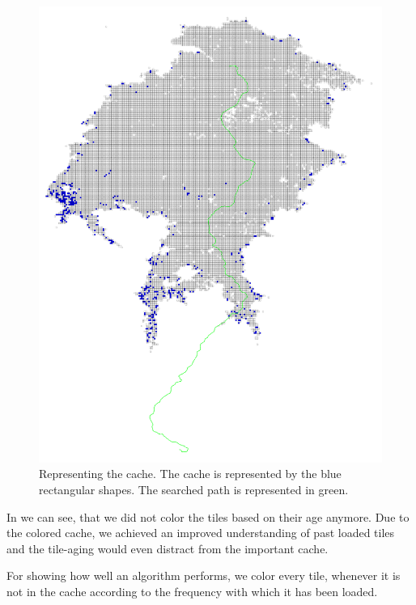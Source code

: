 \documentclass
[
    paper = a4,
    pagesize,
    12 pt,
    twoside,                       %
    open = right,
    DIV = calc,
    BCOR = 0 mm,                   %
    bibtotoc
]
{scrbook}
\begin{document}
\begin{figure}
    \includegraphics[width=\textwidth]{Images/vis-basic-cache.png}
\caption[]{Representing the cache. The cache is represented by the blue rectangular shapes. The searched path is represented in green.}
\label{fig:cache_coloring}
\end{figure}

In  we can see, that we did not color the tiles based on their age anymore.
Due to the colored cache, we achieved an improved understanding of past loaded tiles and the tile-aging would even distract from the important cache.

For showing how well an algorithm performs, we color every tile, whenever it is not in the cache according to the frequency with which it has been loaded.
\end{document}
